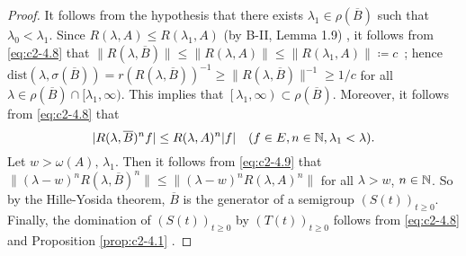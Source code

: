 \begin{proof}
It follows from the hypothesis that there exists $\lambda_{1} \in \rho(\overline{B})$ such that $\lambda_{0} < \lambda_{1}$. 
Since $R(\lambda,A) \leq R(\lambda_{1},A)$ (by B-II, Lemma 1.9)
, it follows from \eqref{eq:c2-4.8} that $\|R(\lambda,\overline{B})\| \leq \|R(\lambda,A)\| \leq \|R(\lambda_{1},A)\| \coloneq c$\, ; 
hence \\
$\text{dist}(\lambda,\sigma(\overline{B})) = r(R(\lambda,\overline{B}))^{-1} \geq \|R(\lambda,\overline{B})\|^{-1} \geq 1/c$ 
for all
$\lambda \in \rho(\overline{B}) \cap [\lambda_{1},\infty)$. 
This implies that $\left[\lambda_{1},\infty\right) \subset \rho(\overline{B})$. Moreover, it follows from \eqref{eq:c2-4.8} that
\begin{equation}\label{eq:c2-4.9}
|R(\lambda,\overline{B})^{n}f| \leq R(\lambda,A)^{n}|f| \quad (f \in E, n \in \mathbb{N} , \lambda_{1} < \lambda).
\end{equation}
Let $w > \omega(A), \,\lambda_{1}$. 
Then it follows from \eqref{eq:c2-4.9} that\\
$\|(\lambda - w)^{n}R(\lambda,\overline{B})^{n}\| \leq \|(\lambda - w)^{n}R(\lambda,A)^{n}\|$ for all $\lambda > w$, $n \in \mathbb{N} $. 
So by the Hille-Yosida theorem, $\overline{B}$ is the generator of a semigroup $(S(t))_{t \geq 0}$. 
Finally, the domination of $(S(t))_{t \geq 0}$ by $(T(t))_{t \geq 0}$ follows from \eqref{eq:c2-4.8} and  Proposition \ref{prop:c2-4.1} .
\end{proof}

